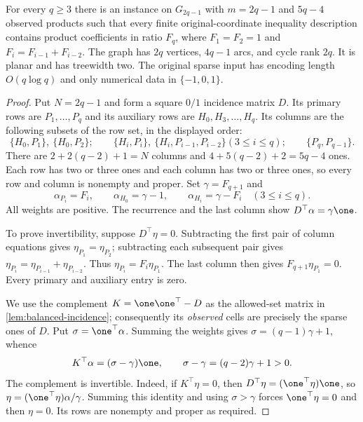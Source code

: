 \begin{theorem}\label{thm:fibonacci}
For every $q\ge3$ there is an instance on $G_{2q-1}$ with $m=2q-1$
and $5q-4$ observed products such that every finite original-coordinate
inequality description contains product coefficients in ratio $F_q$,
where $F_1=F_2=1$ and $F_i=F_{i-1}+F_{i-2}$. The graph has $2q$
vertices, $4q-1$ arcs, and cycle rank $2q$. It is planar and has
treewidth two. The original sparse input has encoding length
$O(q\log q)$ and only numerical data in $\{-1,0,1\}$.
\end{theorem}
\begin{proof}
Put $N=2q-1$ and form a square $0/1$ incidence matrix $D$.
Its primary rows are $P_1,\ldots,P_q$ and its auxiliary rows are
$H_0,H_3,\ldots,H_q$. Its columns are
the following subsets of the row set, in the displayed order:
\begin{equation}\label{eq:fibonacci-columns}
 \{H_0,P_1\},\ \{H_0,P_2\};\qquad
 \{H_i,P_i\},\ \{H_i,P_{i-1},P_{i-2}\} (3\le i\le q);
 \qquad \{P_q,P_{q-1}\}.
\end{equation}
There are $2+2(q-2)+1=N$ columns and $4+5(q-2)+2=5q-4$
ones. Each row has two or three ones and each column has two or
three ones, so every row and column is nonempty and proper.
Set $\gamma=F_{q+1}$ and
\[
 \alpha_{P_i}=F_i,\qquad
 \alpha_{H_0}=\gamma-1,\qquad
 \alpha_{H_i}=\gamma-F_i\quad(3\le i\le q).
\]
All weights are positive. The recurrence and the last column show
$D^\top\alpha=\gamma\one$.

To prove invertibility, suppose $D^\top\eta=0$. Subtracting the
first pair of column equations gives $\eta_{P_1}=\eta_{P_2}$;
subtracting each subsequent pair gives
$\eta_{P_i}=\eta_{P_{i-1}}+\eta_{P_{i-2}}$.
Thus $\eta_{P_i}=F_i\eta_{P_1}$. The last column then gives
$F_{q+1}\eta_{P_1}=0$. Every primary and auxiliary entry is zero.

We use the complement $K=\one\one^\top-D$ as the allowed-set
matrix in \cref{lem:balanced-incidence}; consequently its \emph{observed}
cells are precisely the sparse ones of $D$. Put $\sigma=\one^\top\alpha$.
Summing the weights gives $\sigma=(q-1)\gamma+1$, whence
\[
 K^\top\alpha=(\sigma-\gamma)\one,
 \qquad \sigma-\gamma=(q-2)\gamma+1>0.
\]
The complement is invertible. Indeed, if $K^\top\eta=0$, then
$D^\top\eta=(\one^\top\eta)\one$, so
$\eta=(\one^\top\eta)\alpha/\gamma$. Summing this identity and
using $\sigma>\gamma$ forces $\one^\top\eta=0$ and then $\eta=0$.
Its rows are nonempty and proper as required.


\end{proof}
